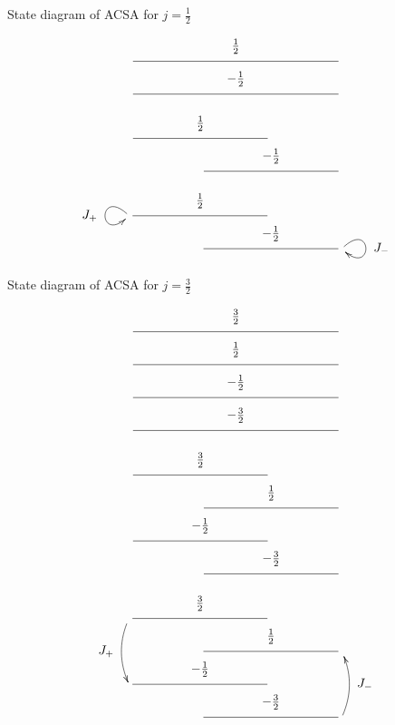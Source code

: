 \documentclass[pdf,colorBG,slideColor,fyma]{prosper}
\begin{document}
 {
\begin{slide}{State diagram of ACSA for $j=\frac{1}{2}$}
{
  \[
  \xymatrix@R=20pt@C=50pt{
    \ar@{-}[rrr]^-*+{\frac12} & & &\\
    \ar@{-}[rrr]^-*+{-\frac12} & & & \\
  }
  \]
}
{
  \[
  \xymatrix@R=20pt@C=50pt{
    \ar@{}[] \ar@{-}[rr]^-*+{\frac12} & & \\
                                                  & \ar@{-}[rr]^-*+{-\frac12} & & \ar@{}[] \\
  }
  \]
}
{
  \[
  \xymatrix@R=20pt@C=50pt{
    \ar@(ul,dl)[]_*+{J_+} \ar@{-}[rr]^-*+{\frac12} & & \\
                                                  & \ar@{-}[rr]^-*+{-\frac12} & & \ar@(ur,dr)[]^*+{J_-} \\
  }
  \]
}
\end{slide}
}

 {
\begin{slide}{State diagram of ACSA for $j=\frac{3}{2}$}
{
  \[
  \xymatrix@R=20pt@C=50pt{
    \ar@{-}[rrr]^-*+{\frac32} & &  & \\
    \ar@{-}[rrr]^-*+{\frac12} & &  & \\
    \ar@{-}[rrr]^-*+{-\frac12} & &  & \\
    \ar@{-}[rrr]^-*+{-\frac32} &  &  & \\
  }
  \]
}
{
  \[
  \xymatrix@R=20pt@C=50pt{
    \ar@{-}[rr]^-*+{\frac32} &                           &  & \\
                                                 & \ar@{-}[rr]^-*+{\frac12}  &  & \\
    \ar@{-}[rr]^-*+{-\frac12}                    &                           &  & \\
                                                 & \ar@{-}[rr]^-*+{-\frac32} &  & \\
  }
  \]
}
{
  \[
  \xymatrix@R=20pt@C=50pt{
    \ar@/_/[dd]_*+{J_+} \ar@{-}[rr]^-*+{\frac32} &                           &  & \\
                                                 & \ar@{-}[rr]^-*+{\frac12}  &  & \\
    \ar@{-}[rr]^-*+{-\frac12}                    &                           &  & \\
                                                 & \ar@{-}[rr]^-*+{-\frac32} &  & \ar@/_/[uu]_*+{J_-}\\
  }
  \]
}
\end{slide}
}
\end{document}
